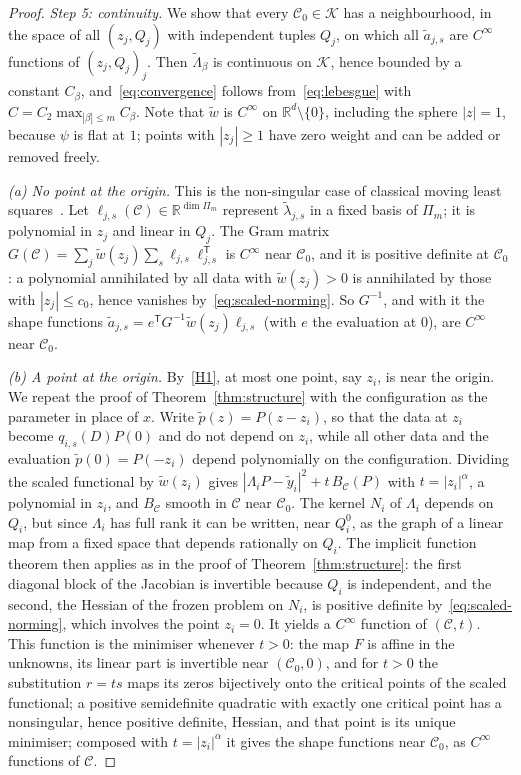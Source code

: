 \documentclass[12pt]{amsart}
\theoremstyle{definition}
\theoremstyle{remark}
\newcommand{\R}{\mathbb{R}}
\newcommand{\Pm}{\Pi_m}
\begin{document}
\begin{proof}
\emph{Step 5: continuity.} We show that every $\mathcal C_0\in\mathcal K$ has a neighbourhood, in the
space of all $(z_j,Q_j)$ with independent tuples $Q_j$, on which all $\tilde a_{j,s}$ are
$C^\infty$ functions of $(z_j,Q_j)_j$. Then $\tilde\Lambda_\beta$ is continuous on
$\mathcal K$, hence bounded by a constant $C_\beta$, and~\eqref{eq:convergence} follows
from~\eqref{eq:lebesgue} with $C=C_2\max_{|\beta|\le m}C_\beta$. Note that $\tilde w$ is
$C^\infty$ on $\R^d\setminus\{0\}$, including the sphere $|z|=1$, because $\psi$ is flat at $1$;
points with $|z_j|\ge1$ have zero weight and can be added or removed freely.

\emph{(a) No point at the origin.} This is the non-singular case of classical moving least
squares~\cite{Wendland2005,Mirzaei2015}. Let $\ell_{j,s}(\mathcal C)\in\R^{\dim\Pm}$ represent
$\tilde\lambda_{j,s}$ in a fixed basis of $\Pm$; it is polynomial in $z_j$ and linear in $Q_j$. The
Gram matrix $G(\mathcal C)=\sum_j\tilde w(z_j)\sum_s\ell_{j,s}\ell_{j,s}^{\mathsf T}$ is $C^\infty$ near
$\mathcal C_0$, and it is positive definite at $\mathcal C_0$: a polynomial annihilated by all data with
$\tilde w(z_j)>0$ is annihilated by those with $|z_j|\le c_0$, hence vanishes
by~\eqref{eq:scaled-norming}. So $G^{-1}$, and with it the shape functions
$\tilde a_{j,s}=e^{\mathsf T}G^{-1}\tilde w(z_j)\ell_{j,s}$ (with $e$ the evaluation at $0$),
are $C^\infty$ near $\mathcal C_0$.

\emph{(b) A point at the origin.} By~\ref{H1}, at most one point, say $z_i$, is near the origin.
We repeat the proof of Theorem~\ref{thm:structure} with the configuration as the parameter in
place of $x$. Write $\tilde p(z)=P(z-z_i)$, so that the data at $z_i$ become $q_{i,s}(D)P(0)$
and do not depend on $z_i$, while all other data and the evaluation $\tilde p(0)=P(-z_i)$ depend
polynomially on the configuration. Dividing the scaled functional by $\tilde w(z_i)$ gives
$|\Lambda_iP-\tilde y_i|^2+t\,B_{\mathcal C}(P)$ with $t=|z_i|^\alpha$, a polynomial in $z_i$, and $B_{\mathcal C}$
smooth in $\mathcal C$ near $\mathcal C_0$. The kernel $N_i$ of $\Lambda_i$ depends on $Q_i$, but since $\Lambda_i$
has full rank it can be written, near $Q_{i}^0$, as the graph of a linear map from a fixed
space that depends rationally on $Q_i$. The implicit function theorem then applies as in the
proof of Theorem~\ref{thm:structure}: the first diagonal block of the Jacobian is invertible
because $Q_i$ is independent, and the second, the Hessian of the frozen problem on $N_i$, is
positive definite by~\eqref{eq:scaled-norming}, which involves the point $z_i=0$. It yields a
$C^\infty$ function of $(\mathcal C,t)$. This function is the minimiser whenever $t>0$: the
map $F$ is affine in the unknowns, its linear part is invertible near $(\mathcal C_0,0)$, and
for $t>0$ the substitution $r=ts$ maps its zeros bijectively onto the critical points of the
scaled functional; a positive semidefinite quadratic with exactly one critical point has a
nonsingular, hence positive definite, Hessian, and that point is its unique minimiser; composed with
$t=|z_i|^\alpha$ it gives the shape functions near $\mathcal C_0$, as $C^\infty$ functions of $\mathcal C$.
\end{proof}
\end{document}
